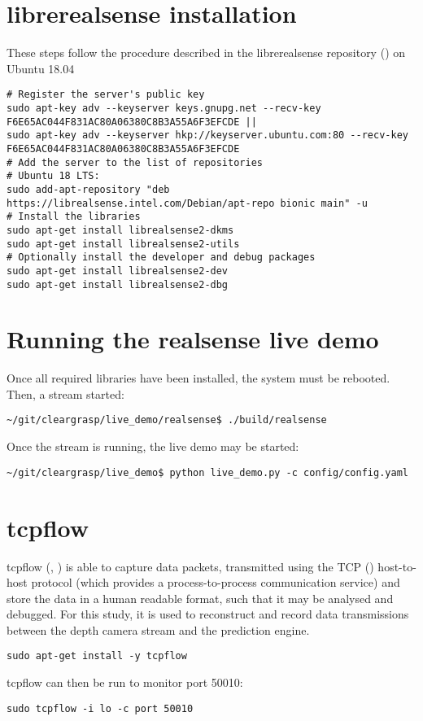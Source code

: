 \section{librerealsense installation}
These steps follow the procedure described in the librerealsense repository (\cite{librealsense2021}) on Ubuntu 18.04
\begin{verbatim}
# Register the server's public key
sudo apt-key adv --keyserver keys.gnupg.net --recv-key F6E65AC044F831AC80A06380C8B3A55A6F3EFCDE ||
sudo apt-key adv --keyserver hkp://keyserver.ubuntu.com:80 --recv-key
F6E65AC044F831AC80A06380C8B3A55A6F3EFCDE 
# Add the server to the list of repositories
# Ubuntu 18 LTS:
sudo add-apt-repository "deb https://librealsense.intel.com/Debian/apt-repo bionic main" -u
# Install the libraries
sudo apt-get install librealsense2-dkms
sudo apt-get install librealsense2-utils
# Optionally install the developer and debug packages
sudo apt-get install librealsense2-dev
sudo apt-get install librealsense2-dbg
\end{verbatim}

\section{Running the realsense live demo}
Once all required libraries have been installed, the system must be rebooted. Then, a stream started:
\begin{verbatim}
~/git/cleargrasp/live_demo/realsense$ ./build/realsense    
\end{verbatim}
Once the stream is running, the live demo may be started:
\begin{verbatim}
~/git/cleargrasp/live_demo$ python live_demo.py -c config/config.yaml
\end{verbatim}

\section{tcpflow}
tcpflow (\cite{tcpflowElson2013}, \cite{garfinkel2013passive}) is able to capture data packets, transmitted using the TCP (\cite{rfc793}) host-to-host protocol (which provides a process-to-process communication service) and store the data in a human readable format, such that it may be analysed and debugged. For this study, it is used to reconstruct and record data transmissions between the depth camera stream and the prediction engine. 

\begin{verbatim}
sudo apt-get install -y tcpflow    
\end{verbatim}

tcpflow can then be run to monitor port 50010:
\begin{verbatim}
sudo tcpflow -i lo -c port 50010  
\end{verbatim}













